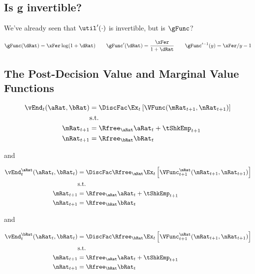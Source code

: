 \documentclass{article}
\begin{document}
\subsection{Is g invertible?}

We've already seen that $\util'(\cdot)$ is invertible, but is $\gFunc$?

\begin{equation}
\gFunc(\dRat) = \xFer \log(1+\dRat) \qquad \gFunc'(\dRat) =
    \frac{\xFer}{1+\dRat} \qquad \gFunc'^{-1}(y) = \xFer/y - 1
\end{equation}

\subsection{The Post-Decision Value and Marginal Value Functions}

\begin{equation}
\begin{split}
        \vEnd_{t}(\aRat, \bRat) & = \DiscFac \Ex_{t} \left[
            \VFunc(\mRat_{t+1}, \nRat_{t+1}) \right] \\
        & \text{s.t.} \\
        \mRat_{t+1} & = \Rfree_{\aRat} \aRat_{t} + \tShkEmp_{t+1} \\
        \nRat_{t+1} & = \Rfree_{\bRat} \bRat_{t}
    \end{split}
\end{equation}

and

\begin{equation}
\begin{split}
        \vEnd_{t}^{\aRat}(\aRat_{t}, \bRat_{t}) & = \DiscFac
        \Rfree_{\aRat} \Ex_{t} \left[ \VFunc^{\mRat}_{t+1}(\mRat_{t+1},
            \nRat_{t+1})
            \right] \\
        & \text{s.t.} \\
        \mRat_{t+1} & = \Rfree_{\aRat} \aRat_{t} + \tShkEmp_{t+1} \\
        \nRat_{t+1} & = \Rfree_{\bRat} \bRat_{t}
    \end{split}
\end{equation}

and

\begin{equation}
\begin{split}
        \vEnd_{t}^{\bRat}(\aRat_{t}, \bRat_{t}) & = \DiscFac
        \Rfree_{\bRat} \Ex_{t} \left[ \VFunc^{\nRat}_{t+1}(\mRat_{t+1},
            \nRat_{t+1})
            \right] \\
        & \text{s.t.} \\
        \mRat_{t+1} & = \Rfree_{\aRat} \aRat_{t} + \tShkEmp_{t+1} \\
        \nRat_{t+1} & = \Rfree_{\bRat} \bRat_{t}
    \end{split}
\end{equation}
\end{document}
